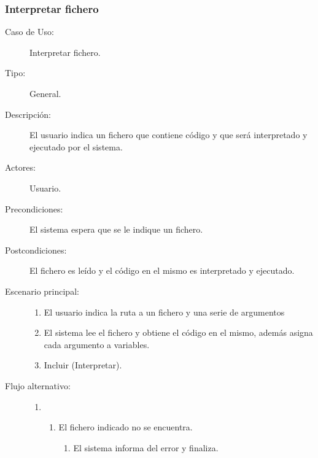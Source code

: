 \subsubsection{Interpretar fichero}

\begin{description}
   \item[Caso de Uso:]  Interpretar fichero.
   \item[Tipo:] General.
   \item[Descripción:] 
   El usuario indica un fichero que contiene código y que será 
   interpretado y ejecutado por el sistema.
   \item[Actores:] 
   Usuario.
   \item[Precondiciones:] 
   El sistema espera que se le indique un fichero.
   \item[Postcondiciones:] 
   El fichero es leído y el código en el mismo es interpretado y ejecutado.
   \item[Escenario principal:] \hfill
   \begin{enumerate}
   \item El usuario indica la ruta a un fichero y una serie de argumentos
   \item El sistema lee el fichero y obtiene el código en el mismo, además asigna cada argumento a variables.
   \item Incluir (Interpretar).
   \end{enumerate}
   
   \item[Flujo alternativo:] \hfill 
   \begin{enumerate} \itemsep1pt \parskip0pt 
   \setcounter{enumi}{1}
   \renewcommand{\labelenumi}{}
   \renewcommand{\labelenumiii}{\arabic{enumiii}.}
   \renewcommand{\labelenumii}{\arabic{enumi}\alph{enumii}.}
      \item 
      \begin {enumerate}
         \setcounter{enumii}{0}
         \item El fichero indicado no se encuentra.
         \begin{enumerate}
         \item El sistema informa del error y finaliza.
         \end{enumerate}
      \end{enumerate}
   \end{enumerate}
\end{description}

